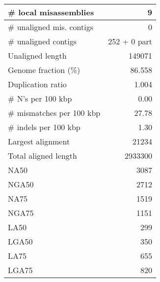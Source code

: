 \documentclass[12pt,a4paper]{article}
\begin{document}
\begin{table}[ht]
\begin{center}
\begin{tabular}{|l*{1}{|r}|}
\# local misassemblies & 9 \\ \hline
\# unaligned mis. contigs & 0 \\ \hline
\# unaligned contigs & 252 + 0 part \\ \hline
Unaligned length & 149071 \\ \hline
Genome fraction (\%) & 86.558 \\ \hline
Duplication ratio & 1.004 \\ \hline
\# N's per 100 kbp & 0.00 \\ \hline
\# mismatches per 100 kbp & 27.78 \\ \hline
\# indels per 100 kbp & 1.30 \\ \hline
Largest alignment & 21234 \\ \hline
Total aligned length & 2933300 \\ \hline
NA50 & 3087 \\ \hline
NGA50 & 2712 \\ \hline
NA75 & 1519 \\ \hline
NGA75 & 1151 \\ \hline
LA50 & 299 \\ \hline
LGA50 & 350 \\ \hline
LA75 & 655 \\ \hline
LGA75 & 820 \\ \hline
\end{tabular}
\end{center}
\end{table}
\end{document}
